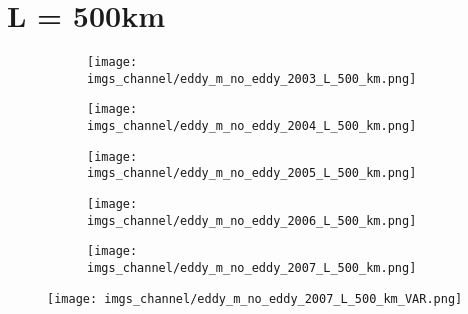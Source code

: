 \documentclass[12pt,a4paper]{article}
\begin{document}
\section*{L = 500km}
\begin{figure}[h!]
\centering
\begin{subfigure}[t]{\textwidth}
\texttt{[image: imgs\_channel/eddy\_m\_no\_eddy\_2003\_L\_500\_km.png]}
\end{subfigure}
\begin{subfigure}[t]{\textwidth}
\texttt{[image: imgs\_channel/eddy\_m\_no\_eddy\_2004\_L\_500\_km.png]}
\end{subfigure}
\begin{subfigure}[t]{\textwidth}
\texttt{[image: imgs\_channel/eddy\_m\_no\_eddy\_2005\_L\_500\_km.png]}
\end{subfigure}
\end{figure}
\begin{figure}[h!]
\begin{subfigure}[t]{\textwidth}
\texttt{[image: imgs\_channel/eddy\_m\_no\_eddy\_2006\_L\_500\_km.png]}
\end{subfigure}
\begin{subfigure}[t]{\textwidth}
\texttt{[image: imgs\_channel/eddy\_m\_no\_eddy\_2007\_L\_500\_km.png]}
\end{subfigure}
\end{figure}


\begin{figure}[h!]
\texttt{[image: imgs\_channel/eddy\_m\_no\_eddy\_2007\_L\_500\_km\_VAR.png]}
\end{figure}
\end{document}
